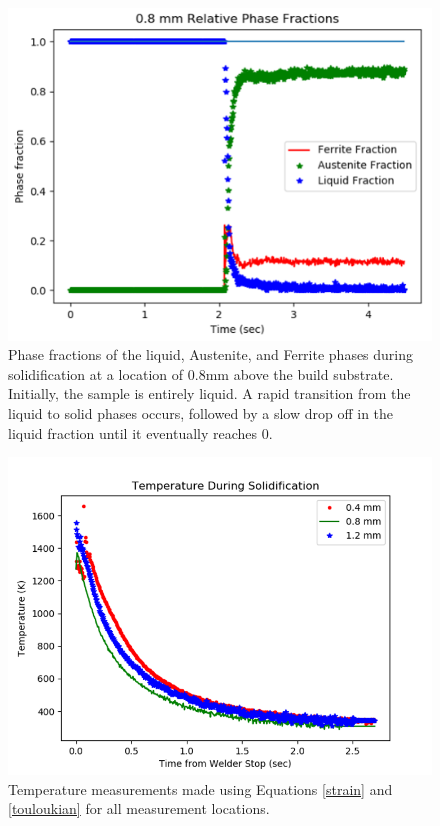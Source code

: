 \documentclass[twocolumn,nofootinbib,notitlepage,aps]{revtex4-1}
\begin{document}
\begin{figure}
	\includegraphics[width=1\linewidth]{converted_liq_phase_fraction}
	\caption{Phase fractions of the liquid, Austenite, and Ferrite phases during solidification at a location of 0.8mm above the build substrate. Initially, the sample is entirely liquid. A rapid transition from the liquid to solid phases occurs, followed by a slow drop off in the liquid fraction until it eventually reaches 0.}
	\label{phasefraction}
\end{figure}

\begin{figure}
	\includegraphics[width=1\linewidth]{converted_SS_temp}
	\caption{Temperature measurements made using Equations \ref{strain} and \ref{touloukian} for all measurement locations.}
	\label{temp}
\end{figure}
\end{document}
